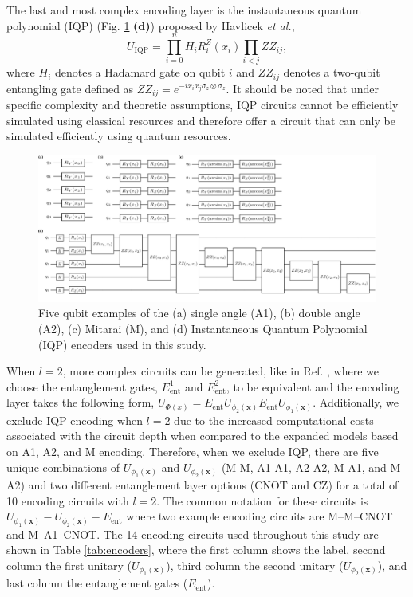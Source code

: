 \documentclass[journal=jacsat,manuscript=article]{achemso}
\begin{document}
The last and most complex encoding layer is the instantaneous quantum polynomial (IQP) (Fig. \ref{fig:encoders} \textbf{(d)}) proposed by Havlicek \textit{et al.}\cite{havlicek_supervised_2019},
\begin{equation}
	U_{\text{IQP}}  = \prod_{i=0}^{n} H_{i} R^{Z}_{i}(x_{i})  \prod_{i<j} ZZ_{ij},
	\label{eq:IQP}
\end{equation}
where $H_{i}$ denotes a Hadamard gate on qubit $i$ and $ZZ_{ij}$ denotes a two-qubit entangling gate defined as $ZZ_{ij} = e^{-i x_{i} x_{j} \sigma_{z} \otimes \sigma_{z}}$.
It should be noted that under specific complexity and theoretic assumptions, IQP circuits cannot be efficiently simulated using classical resources and therefore offer a circuit that can only be simulated efficiently using quantum resources.\cite{lund_quantum_2017,harrow_quantum_2017}

  


  
\begin{figure}[H]
	\centering
	\includegraphics[width=\textwidth]{../images/encoders/quantikz/combined.png}
	\caption{Five qubit examples of the (a) single angle (A1), (b) double angle (A2), (c) Mitarai (M), and (d) Instantaneous Quantum Polynomial (IQP) encoders used in this study.}
	\label{fig:encoders}
\end{figure}

When $l=2$, more complex circuits can be generated, like in Ref. \citep{suzuki_predicting_2020}, where we choose the entanglement gates, $E_{\text{ent}}^{1}$ and $E_{\text{ent}}^{2}$, to be equivalent and the encoding layer takes the following form, $U_{\Phi(x)} =  E_{\text{ent}} U_{\phi_{2}(\mathbf{x})} E_{\text{ent}} U_{\phi_{1}(\mathbf{x})}$.
Additionally, we exclude IQP encoding when $l=2$ due to the increased computational costs associated with the circuit depth when compared to the expanded models based on A1, A2, and M encoding.
Therefore, when we exclude IQP, there are five unique combinations of $U_{\phi_{1}(\mathbf{x})}$ and $U_{\phi_{2}(\mathbf{x})}$ (M-M, A1-A1, A2-A2, M-A1, and M-A2) and two different entanglement layer options (CNOT and CZ) for a total of 10 encoding circuits with $l=2$.
The common notation for these circuits is $U_{\phi_{1}(\mathbf{x})}-U_{\phi_{2}(\mathbf{x})}-E_{\text{ent}}$ where two example encoding circuits are M--M--CNOT and M--A1--CNOT.
The 14 encoding circuits used throughout this study are shown in Table \ref{tab:encoders}, where the first column shows the label, second column the first unitary ($U_{\phi_{1}(\mathbf{x})}$), third column the second unitary ($U_{\phi_{2}(\mathbf{x})}$), and last column the entanglement gates ($E_{\text{ent}}$).
\end{document}
